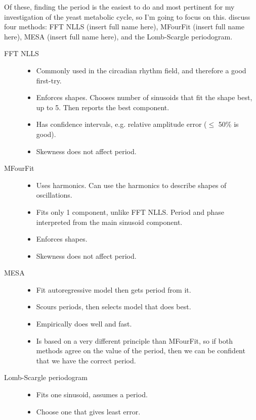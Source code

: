 Of these, finding the period is the easiest to do and most pertinent for my investigation of the yeast metabolic cycle, so I'm going to focus on this.
\textcite{zielinskiStrengthsLimitationsPeriod2014} discuss four methods: FFT NLLS (insert full name here), MFourFit (insert full name here), MESA (insert full name here), and the Lomb-Scargle periodogram.

\begin{description}
    \item [FFT NLLS]
        \begin{itemize}
            \item Commonly used in the circadian rhythm field, and therefore a good first-try.
            \item Enforces shapes.  Chooses number of sinusoids that fit the shape best, up to 5.  Then reports the best component.
            \item Has confidence intervals, e.g. relative amplitude error ($\leq$ 50\% is good).
            \item Skewness does not affect period.
        \end{itemize}
    \item [MFourFit]
        \begin{itemize}
            \item Uses harmonics.  Can use the harmonics to describe shapes of oscillations.
            \item Fits only 1 component, unlike FFT NLLS.  Period and phase interpreted from the main sinusoid component.
            \item Enforces shapes.
            \item Skewness does not affect period.
        \end{itemize}
    \item [MESA]
        \begin{itemize}
            \item Fit autoregressive model then gets period from it.
            \item Scours periods, then selects model that does best.
            \item Empirically does well and fast.
            \item Is based on a very different principle than MFourFit, so if both methods agree on the value of the period, then we can be confident that we have the correct period.
        \end{itemize}
    \item [Lomb-Scargle periodogram]
        \begin{itemize}
            \item Fits one sinusoid, assumes a period.
            \item Choose one that gives least error.
        \end{itemize}
\end{description}


